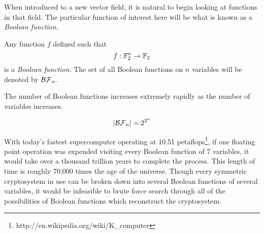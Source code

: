 \par When introduced to a new vector field, it is natural to begin looking
at functions in that field. The particular function of interest here will
be what is known as a {\em Boolean function}.

\begin{definition}
\label{def:boolean-function}
  Any function $f$ defined such that 
  \begin{equation*}
    f:\mathbb{F}_2^n\rightarrow\mathbb{F}_2
  \end{equation*}
  is a {\em Boolean function}. The set of all Boolean functions on $n$
  variables will be denoted by $\mathcal{BF}_n$.
\end{definition}

\par The number of Boolean functions increases extremely rapidly as the
number of variables increases.

\begin{equation}
  \lvert\mathcal{BF}_n\rvert = 2^{2^n}
\end{equation}

\par With today's fastest supercomputer operating at 10.51
petaflops\footnote{http://en.wikipedia.org/wiki/K\_computer}, if one
floating point operation was expended visiting every Boolean function of 7
variables, it would take over a thousand trillion years to complete the
process. This length of time is roughly 70,000 times the age of the
universe. Though every symmetric cryptosystem in use can be broken down into
several Boolean functions of several variables, it would be infeasible to
brute force search through all of the possibilities of Boolean functions
which reconstruct the cryptosystem.

